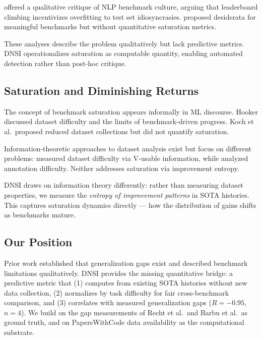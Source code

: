 \citet{bowman2021fix} offered a qualitative critique of NLP benchmark culture, arguing that leaderboard climbing incentivizes overfitting to test set idiosyncrasies. \citet{schlangen2021targeting} proposed desiderata for meaningful benchmarks but without quantitative saturation metrics.

These analyses describe the problem qualitatively but lack predictive metrics. DNSI operationalizes saturation as computable quantity, enabling automated detection rather than post-hoc critique.

\subsection{Saturation and Diminishing Returns}

The concept of benchmark saturation appears informally in ML discourse. Hooker discussed dataset difficulty and the limits of benchmark-driven progress. Koch et al.\ proposed reduced dataset collections but did not quantify saturation.

Information-theoretic approaches to dataset analysis exist but focus on different problems: \citet{ethayarajh2022understanding} measured dataset difficulty via V-usable information, while \citet{rodriguez2021evaluation} analyzed annotation difficulty. Neither addresses saturation via improvement entropy.

DNSI draws on information theory differently: rather than measuring dataset properties, we measure the \emph{entropy of improvement patterns} in SOTA histories. This captures saturation dynamics directly --- how the distribution of gains shifts as benchmarks mature.

\subsection{Our Position}

Prior work established that generalization gaps exist and described benchmark limitations qualitatively. DNSI provides the missing quantitative bridge: a predictive metric that (1) computes from existing SOTA histories without new data collection, (2) normalizes by task difficulty for fair cross-benchmark comparison, and (3) correlates with measured generalization gaps ($R = -0.95$, $n=4$). We build on the gap measurements of Recht et al.\ and Barbu et al.\ as ground truth, and on PapersWithCode data availability as the computational substrate.
